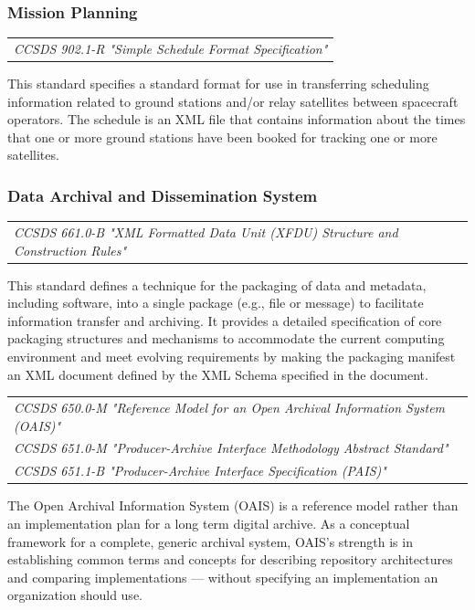 \subsubsection{Mission Planning}

\begin{tabular}{l}
\textit{CCSDS 902.1-R "Simple Schedule Format Specification" \cite{CCSDS 902.1-R}} \\
\end{tabular}

This standard specifies a standard format for use in transferring scheduling information related to ground stations and/or relay satellites between spacecraft operators. The schedule is an XML file that contains information about the times that one or more ground stations have been booked for tracking one or more satellites.

\subsubsection{Data Archival and Dissemination System}

\begin{tabular}{l}
\textit{CCSDS 661.0-B "XML Formatted Data Unit (XFDU) Structure and Construction Rules" \cite{CCSDS 661.0-B}} \\
\end{tabular}

This standard defines a technique for the packaging of data and metadata, including software, into a single package (e.g., file or message) to facilitate information transfer and archiving. It provides a detailed specification of core packaging structures and mechanisms to accommodate the current computing environment and meet evolving requirements by making the packaging manifest an XML document defined by the XML Schema specified in the document.

\begin{tabular}{l}
\textit{CCSDS 650.0-M "Reference Model for an Open Archival Information System (OAIS)" \cite{CCSDS 650.0-M}} \\
\textit{CCSDS 651.0-M "Producer-Archive Interface Methodology Abstract Standard" \cite{CCSDS 651.0-M}} \\
\textit{CCSDS 651.1-B "Producer-Archive Interface Specification (PAIS)" \cite{CCSDS 651.1-B}} \\
\end{tabular}

The Open Archival Information System (OAIS) is a reference model rather than an implementation plan for a long term digital archive. As a conceptual framework for a complete, generic archival system, OAIS's strength is in establishing common terms and concepts for describing repository architectures and comparing implementations — without specifying an implementation an organization should use. 

